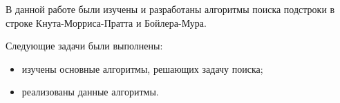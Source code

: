 \newpage
{}

В данной работе были изучены и разработаны алгоритмы поиска
подстроки в строке Кнута-Морриса-Пратта и Бойлера-Мура.

Следующие задачи были выполнены:

\begin{itemize}
    \item изучены основные алгоритмы, решающих задачу поиска;
    \item реализованы данные алгоритмы.
\end{itemize}
